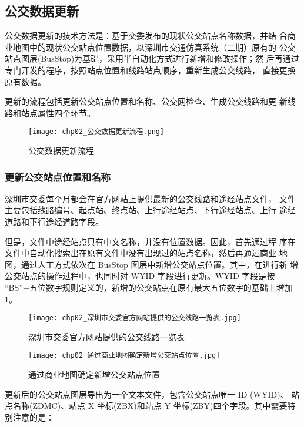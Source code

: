 \subsection{公交数据更新}
公交数据更新的技术方法是：基于交委发布的现状公交站点名称数据，并结
合商业地图中的现状公交站点位置数据，以深圳市交通仿真系统（二期）原有的
公交站点图层(BusStop)为基础，采用半自动化方式进行新增和修改操作；然
后再通过专门开发的程序，按照站点位置和线路站点顺序，重新生成公交线路，
直接更换原有数据。

更新的流程包括更新公交站点位置和名称、公交网检查、生成公交线路和更
新线路和站点属性四个环节。

\begin{figure}[ht]
  \centering
  \texttt{[image: chp02\_公交数据更新流程.png]}
  \caption{公交数据更新流程\label{fig:公交数据更新流程} }
\end{figure}

\subsubsection{更新公交站点位置和名称} \label{subsubsec:更新公交站点位置和名称}
深圳市交委每个月都会在官方网站上提供最新的公交线路和途经站点文件，
文件主要包括线路编号、起点站、终点站、上行途经站点、下行途经站点、上行
途经道路和下行途经道路字段。

但是，文件中途经站点只有中文名称，并没有位置数据。因此，首先通过程
序在文件中自动化搜索出在原有文件中没有出现过的站点名称，然后再通过商业
地图，通过人工方式依次在 BusStop 图层中新增公交站点位置。其中，在进行新
增公交站点的操作过程中，也同时对 WYID 字段进行更新。WYID 字段是按
“BS”+五位数字规则定义的，新增的公交站点在原有最大五位数字的基础上增加 1。

\begin{figure}[!ht]
  \centering
  \texttt{[image: chp02\_深圳市交委官方网站提供的公交线路一览表.jpg]}
  \caption{深圳市交委官方网站提供的公交线路一览表\label{fig:深圳市交委官方网站提供的公交线路一览表} }
\end{figure}

\begin{figure}[!ht]
  \centering
  \texttt{[image: chp02\_通过商业地图确定新增公交站点位置.jpg]}
  \caption{通过商业地图确定新增公交站点位置\label{fig:通过商业地图确定新增公交站点位置} }
\end{figure}

更新后的公交站点图层导出为一个文本文件，包含公交站点唯一 ID (WYID)、
站点名称(ZDMC)、站点 X 坐标(ZBX)和站点 Y 坐标(ZBY)四个字段。其中需要特别注意的是：

